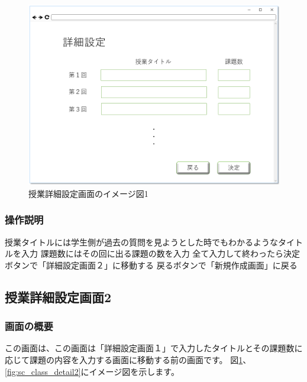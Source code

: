 \begin{figure}[htbp]
\begin{center}
  \includegraphics[width=1\linewidth,clip]{./img/sc_class_detail1.png}
  \caption{授業詳細設定画面のイメージ図1}\label{fig:sc_class_detail1}
\end{center}
\end{figure}

\subsubsection{操作説明}
授業タイトルには学生側が過去の質問を見ようとした時でもわかるようなタイトルを入力
課題数にはその回に出る課題の数を入力
全て入力して終わったら決定ボタンで「詳細設定画面２」に移動する
戻るボタンで「新規作成画面」に戻る

\subsection{授業詳細設定画面2}
\subsubsection{画面の概要}
この画面は、この画面は「詳細設定画面１」で入力したタイトルとその課題数に応じて課題の内容を入力する画面に移動する前の画面です。
図\ref{fig:sc_class_detail1}、\ref{fig:sc_class_detail2}にイメージ図を示します。

